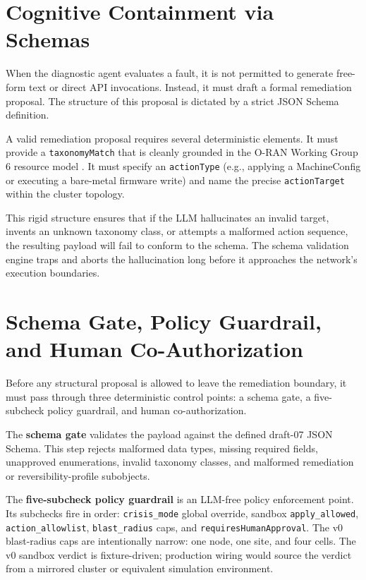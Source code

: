 \documentclass[twocolumn,10pt,a4paper]{article}
\begin{document}
\section{Cognitive Containment via Schemas}
\label{sec:containment}

When the diagnostic agent evaluates a fault, it is not permitted to generate free-form text or direct API invocations. Instead, it must draft a formal remediation proposal. The structure of this proposal is dictated by a strict JSON Schema definition.

A valid remediation proposal requires several deterministic elements. It must provide a \texttt{taxonomyMatch} that is cleanly grounded in the O-RAN Working Group 6 resource model \cite{oran_o2_ganp}. It must specify an \texttt{actionType} (e.g., applying a MachineConfig or executing a bare-metal firmware write) and name the precise \texttt{actionTarget} within the cluster topology.

This rigid structure ensures that if the LLM hallucinates an invalid target, invents an unknown taxonomy class, or attempts a malformed action sequence, the resulting payload will fail to conform to the schema. The schema validation engine traps and aborts the hallucination long before it approaches the network's execution boundaries.

\section{Schema Gate, Policy Guardrail, and Human Co-Authorization}
\label{sec:gates}

Before any structural proposal is allowed to leave the remediation boundary, it must pass through three deterministic control points: a schema gate, a five-subcheck policy guardrail, and human co-authorization.

The \textbf{schema gate} validates the payload against the defined draft-07 JSON Schema. This step rejects malformed data types, missing required fields, unapproved enumerations, invalid taxonomy classes, and malformed remediation or reversibility-profile subobjects.

The \textbf{five-subcheck policy guardrail} is an LLM-free policy enforcement point. Its subchecks fire in order: \texttt{crisis\_mode} global override, sandbox \texttt{apply\_allowed}, \texttt{action\_allowlist}, \texttt{blast\_radius} caps, and \texttt{requiresHumanApproval}. The v0 blast-radius caps are intentionally narrow: one node, one site, and four cells. The v0 sandbox verdict is fixture-driven; production wiring would source the verdict from a mirrored cluster or equivalent simulation environment.
\end{document}

